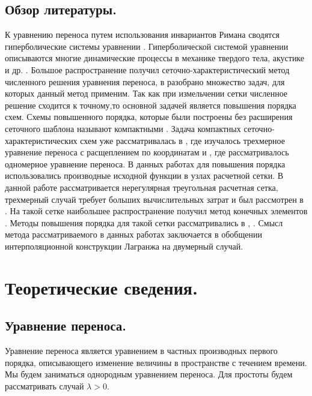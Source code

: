 \documentclass[14pt]{article}
\begin{document}
\subsection*{Обзор литературы.}
К уравнению переноса путем использования инвариантов Римана сводятся гиперболические системы уравнении \cite{1}. Гиперболической системой уравнении описываются многие динамические процессы в механике твердого тела, акустике и др. \cite{2}.  Большое распространение получил сеточно-характеристический метод численного решения уравнения переноса, в \cite{3} разобрано множество задач, для которых данный метод применим. Так как при измельчении сетки численное решение сходится к точному,то основной задачей является повышения порядка схем. Схемы повышенного порядка, которые были построены без расширения сеточного шаблона называют компактными \cite{4}. Задача  компактных сеточно-характеристических схем уже рассматривалась в \cite{5}, где изучалось трехмерное уравнение переноса с расщеплением по координатам и \cite{6}, где рассматривалось одномерное уравнение переноса. В данных работах для повышения порядка использовались производные исходной функции в узлах расчетной сетки. В данной работе рассматривается нерегулярная треугольная расчетная сетка, трехмерный случай требует больших вычислительных затрат и был рассмотрен в \cite{7}. На такой сетке наибольшее распространение получил метод конечных элементов \cite{8}. Методы повышения порядка для такой сетки рассматривались в \cite{9}, \cite{10}. Смысл метода рассматриваемого в данных работах заключается в обобщении интерполяционной конструкции Лагранжа на двумерный случай.  
\newpage
\section{Теоретические сведения.}
\subsection{Уравнение переноса.}
Уравнение переноса является уравнением в частных производных первого порядка, описывающего изменение величины в пространстве с течением времени. Мы будем заниматься однородным уравнением переноса. Для простоты будем рассматривать случай $\lambda>0$.
\end{document}
